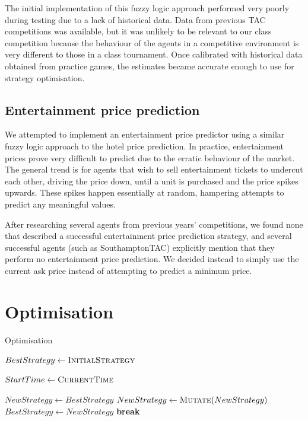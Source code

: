 \documentclass{acm_proc_article-sp}
\newcommand{\Break}{\State \textbf{break}}
\begin{document}
The initial implementation of this fuzzy logic approach performed very poorly during testing due to a lack of historical data. Data from previous TAC competitions was available, but it was unlikely to be relevant to our class competition because the behaviour of the agents in a competitive environment is very different to those in a class tournament. Once calibrated with historical data obtained from practice games, the estimates became accurate enough to use for strategy optimisation.

\newpage

\subsection{Entertainment price prediction}

We attempted to implement an entertainment price predictor using a similar fuzzy logic approach to the hotel price prediction. In practice, entertainment prices prove very difficult to predict due to the erratic behaviour of the market. The general trend is for agents that wish to sell entertainment tickets to undercut each other, driving the price down, until a unit is purchased and the price spikes upwards. These spikes happen essentially at random, hampering attempts to predict any meaningful values.

After researching several agents from previous years' competitions, we found none that described a successful entertainment price prediction strategy, and several successful agents (such as SouthamptonTAC) explicitly mention that they perform no entertainment price prediction. We decided instead to simply use the current ask price instead of attempting to predict a minimum price.

\section{Optimisation}

\begin{algorithm}[b]
  \caption{Optimisation}
  \label{alg:optimisation}
  \begin{algorithmic}
    \small
    \State $BestStrategy \gets \Call{InitialStrategy}{}$

      \State $StartTime \gets \Call{CurrentTime}{}$

        \State $NewStrategy \gets BestStrategy$
          \State $NewStrategy \gets \Call{Mutate}{NewStrategy}$
            \State $BestStrategy \gets NewStrategy$
            \Break
          \EndIf
        \EndFor
      \EndWhile
      \State {}
    \EndFunction
  \end{algorithmic}
\end{algorithm}
\end{document}
